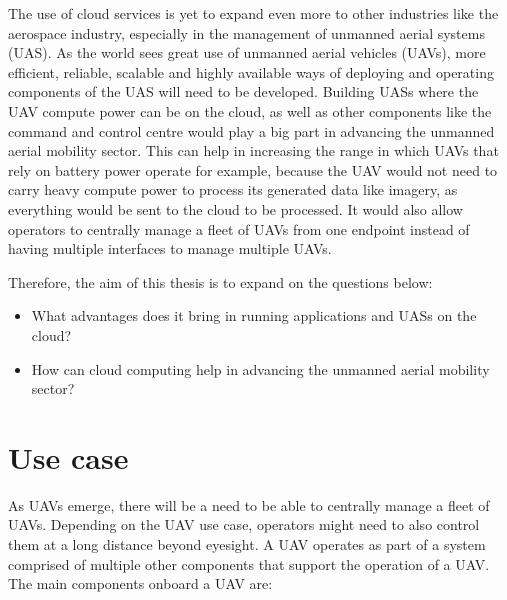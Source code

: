 The use of cloud services is yet to expand even more to other industries like the aerospace industry, especially in the management of unmanned aerial systems (UAS). As the world sees great use of unmanned aerial vehicles (UAVs), more efficient, reliable, scalable and highly available ways of deploying and operating components of the UAS will need to be developed. Building UASs where the UAV compute power can be on the cloud, as well as other components like the command and control centre would play a big part in advancing the unmanned aerial mobility sector. This can help in increasing the range in which UAVs that rely on battery power operate for example, because the UAV would not need to carry heavy compute power to process its generated data like imagery, as everything would be sent to the cloud to be processed. It would also allow operators to centrally manage a fleet of UAVs from one endpoint instead of having multiple interfaces to manage multiple UAVs.

Therefore, the aim of this thesis is to expand on the questions below:

\begin{itemize}
    \item What advantages does it bring in running applications and UASs on the cloud?
    \item How can cloud computing help in advancing the unmanned aerial mobility sector?
\end{itemize}




\section{Use case}
\label{sec:use-case}

As UAVs emerge, there will be a need to be able to centrally manage a fleet of UAVs. Depending on the UAV use case, operators might need to also control them at a long distance beyond eyesight. A UAV operates as part of a system comprised of multiple other components that support the operation of a UAV. The main components onboard a UAV are:

